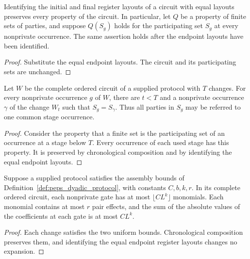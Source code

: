 \begin{lemma}
    \label{lem:peps_circuit_layout_participants}
    \leanok
    Identifying the initial and final register layouts of a circuit with equal
    layouts preserves every property of the circuit. In particular, let $Q$
    be a property of finite sets of parties, and suppose $Q(S_g)$ holds for
    the participating set $S_g$ at every nonprivate occurrence. The same
    assertion holds after the endpoint layouts have been identified.
\end{lemma}
\begin{proof}\leanok
    Substitute the equal endpoint layouts. The circuit and its participating
    sets are unchanged.
\end{proof}

\begin{lemma}
    \label{lem:peps_dyadic_circuit_stage_participants}
    \leanok
    Let $W$ be the complete ordered circuit of a supplied protocol with
    $T$ changes. For every nonprivate occurrence $g$ of $W$, there are
    $t<T$ and a nonprivate occurrence $\gamma$ of the change $W_t$ such
    that $S_g=S_\gamma$. Thus all parties in $S_g$ may be referred to
    one common stage occurrence.
\end{lemma}
\begin{proof}\leanok
    Consider the property that a finite set is the participating set of
    an occurrence at a stage below $T$. Every occurrence of each used
    stage has this property. It is preserved by chronological composition
    and by identifying the equal endpoint layouts.
\end{proof}

\begin{theorem}
    \label{thm:peps_dyadic_circuit_expansions}
    \leanok
    Suppose a supplied protocol satisfies the assembly bounds of
    Definition~\ref{def:peps_dyadic_protocol}, with constants $C,b,k,r$.
    In its complete ordered circuit, each nonprivate gate has at most
    $\lfloor C L^k\rfloor$ monomials. Each monomial contains at most
    $r$ pair effects, and the sum of the absolute values of the coefficients
    at each gate is at most $C L^k$.
\end{theorem}
\begin{proof}\leanok
    Each change satisfies the two uniform bounds. Chronological composition
    preserves them, and identifying the equal endpoint register layouts
    changes no expansion.
\end{proof}
